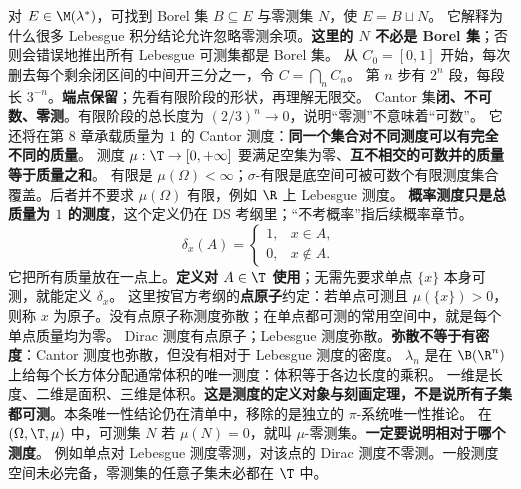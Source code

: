 对 $E\in\M(\lambda^*)$，可找到 Borel 集 $B\subseteq E$ 与零测集 $N$，使 $E=B\sqcup N$。
它解释为什么很多 Lebesgue 积分结论允许忽略零测余项。\textbf{这里的 $N$ 不必是 Borel 集}；否则会错误地推出所有 Lebesgue 可测集都是 Borel 集。
从 $C_0=[0,1]$ 开始，每次删去每个剩余闭区间的中间开三分之一，令 $C=\bigcap_n C_n$。
第 $n$ 步有 $2^n$ 段，每段长 $3^{-n}$。\textbf{端点保留}；先看有限阶段的形状，再理解无限交。
Cantor 集\textbf{闭、不可数、零测}。有限阶段的总长度为 $(2/3)^n\to0$，说明“零测”不意味着“可数”。
它还将在第 8 章承载质量为 $1$ 的 Cantor 测度：\textbf{同一个集合对不同测度可以有完全不同的质量}。
测度 $\mu:\T\to[0,+\infty]$ 要满足空集为零、\textbf{互不相交的可数并的质量等于质量之和}。
有限是 $\mu(\Omega)<\infty$；$\sigma$-有限是底空间可被可数个有限测度集合覆盖。后者并不要求 $\mu(\Omega)$ 有限，例如 $\R$ 上 Lebesgue 测度。
\textbf{概率测度只是总质量为 $1$ 的测度}，这个定义仍在 DS 考纲里；“不考概率”指后续概率章节。
\[
\delta_x(A)=\begin{cases}1,&x\in A,\\0,&x\notin A.\end{cases}
\]
它把所有质量放在一点上。\textbf{定义对 $A\in\T$ 使用}；无需先要求单点 $\{x\}$ 本身可测，就能定义 $\delta_x$。
这里按官方考纲的\textbf{点原子}约定：若单点可测且 $\mu(\{x\})>0$，则称 $x$ 为原子。没有点原子称测度弥散；在单点都可测的常用空间中，就是每个单点质量均为零。
Dirac 测度有点原子；Lebesgue 测度弥散。\textbf{弥散不等于有密度}：Cantor 测度也弥散，但没有相对于 Lebesgue 测度的密度。
$\lambda_n$ 是在 $\B(\R^n)$ 上给每个长方体分配通常体积的唯一测度：体积等于各边长度的乘积。
一维是长度、二维是面积、三维是体积。\textbf{这是测度的定义对象与刻画定理，不是说所有子集都可测}。本条唯一性结论仍在清单中，移除的是独立的 $\pi$-系统唯一性推论。
在 $(\Omega,\T,\mu)$ 中，可测集 $N$ 若 $\mu(N)=0$，就叫 $\mu$-零测集。\textbf{一定要说明相对于哪个测度}。
例如单点对 Lebesgue 测度零测，对该点的 Dirac 测度不零测。一般测度空间未必完备，零测集的任意子集未必都在 $\T$ 中。
